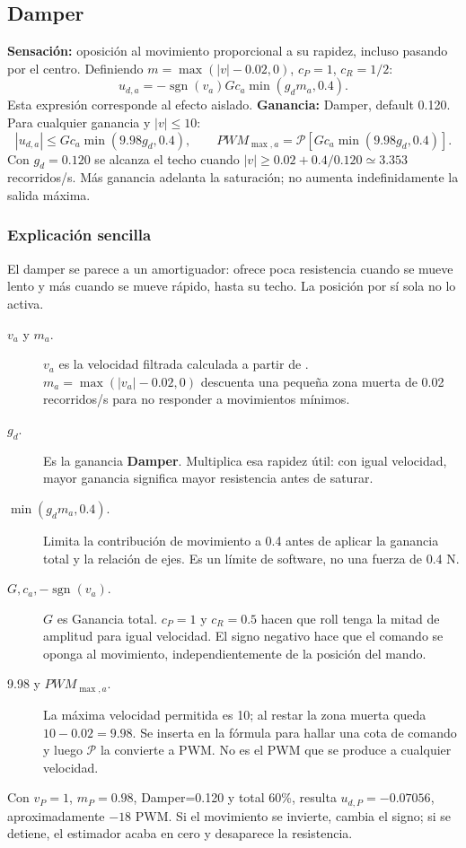 \documentclass[11pt,a4paper]{article}
\newcommand{\sgn}{\operatorname{sgn}}
\newcommand{\code}[1]{\texttt{\detokenize{#1}}}
\begin{document}
\subsection{Damper}
\textbf{Sensación:} oposición al movimiento proporcional a su rapidez, incluso pasando por el centro. Definiendo $m=\max(|v|-0.02,0)$, $c_P=1$, $c_R=1/2$:
\begin{equation}u_{d,a}=-\sgn(v_a)Gc_a\min(g_d m_a,0.4).\end{equation}
Esta expresión corresponde al efecto aislado. \textbf{Ganancia:} Damper, default 0.120. Para cualquier ganancia y $|v|\leq10$:
\begin{equation}|u_{d,a}|\leq Gc_a\min(9.98g_d,0.4),\qquad PWM_{\max,a}=\mathcal P[Gc_a\min(9.98g_d,0.4)].\end{equation}
Con $g_d=0.120$ se alcanza el techo cuando $|v|\geq0.02+0.4/0.120\simeq3.353$ recorridos/s. Más ganancia adelanta la saturación; no aumenta indefinidamente la salida máxima.


\subsubsection{Explicación sencilla}
El damper se parece a un amortiguador: ofrece poca resistencia cuando se mueve lento y más cuando se mueve rápido, hasta su techo. La posición por sí sola no lo activa.
\begin{description}
\item[$v_a$ y $m_a$.] $v_a$ es la velocidad filtrada calculada a partir de \code{YOKE X/Y POSITION}. $m_a=\max(|v_a|-0.02,0)$ descuenta una pequeña zona muerta de 0.02 recorridos/s para no responder a movimientos mínimos.
\item[$g_d$.] Es la ganancia \textbf{Damper}. Multiplica esa rapidez útil: con igual velocidad, mayor ganancia significa mayor resistencia antes de saturar.
\item[$\min(g_dm_a,0.4)$.] Limita la contribución de movimiento a 0.4 antes de aplicar la ganancia total y la relación de ejes. Es un límite de software, no una fuerza de 0.4 N.
\item[$G,c_a,-\sgn(v_a)$.] $G$ es Ganancia total. $c_P=1$ y $c_R=0.5$ hacen que roll tenga la mitad de amplitud para igual velocidad. El signo negativo hace que el comando se oponga al movimiento, independientemente de la posición del mando.
\item[9.98 y $PWM_{\max,a}$.] La máxima velocidad permitida es 10; al restar la zona muerta queda $10-0.02=9.98$. Se inserta en la fórmula para hallar una cota de comando y luego $\mathcal P$ la convierte a PWM. No es el PWM que se produce a cualquier velocidad.
\end{description}
Con $v_P=1$, $m_P=0.98$, Damper=0.120 y total 60\%, resulta $u_{d,P}=-0.07056$, aproximadamente $-18$ PWM. Si el movimiento se invierte, cambia el signo; si se detiene, el estimador acaba en cero y desaparece la resistencia.
\end{document}
